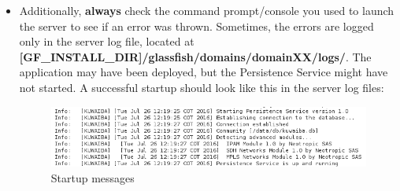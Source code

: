 \documentclass[a4paper]{article}
\begin{document}
\begin{itemize}
\begin{framed} {\large \textbf{Important}}
					Windows users, please refer to PuTTY documentation on how to create SSH tunnels \footnote{PuTTY https://www.chiark.greenend.org.uk/~sgtatham/putty/latest.html}.
				\end{framed}
				\item Additionally, \textbf{always} check the command prompt/console you used to launch the server to see if an error was thrown. Sometimes, the errors are logged only in the server log file, located at \textbf{[GF\_INSTALL\_DIR]/glassfish/domains/domainXX/logs/}. The application may have been deployed, but the Persistence Service might have not started. A successful startup should look like this in the server log files:
				\begin{figure}[h!]
					\includegraphics[width=\linewidth]{img/log_messages.png} 	
					\caption{Startup messages}
					\label{fig:startup_messages}
				\end{figure}
			\end{itemize}
			
			\newpage
\end{document}
